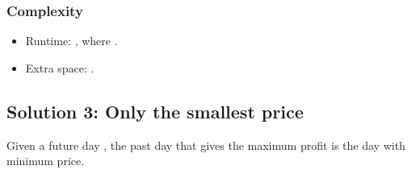 \documentclass[letterpaper,12pt,english]{book}
\begin{document}
\subsubsection{Complexity}
\label{\detokenize{Mathematics/09_MTH_121_Best_Time_to_Buy_and_Sell_Stock:id2}}\begin{itemize}
\item {} 
\sphinxAtStartPar
Runtime: , where .

\item {} 
\sphinxAtStartPar
Extra space: .

\end{itemize}


\subsection{Solution 3: Only the smallest price}
\label{\detokenize{Mathematics/09_MTH_121_Best_Time_to_Buy_and_Sell_Stock:solution-3-only-the-smallest-price}}
\sphinxAtStartPar
Given a future day , the past day  that gives the maximum profit is the day with minimum price.
\end{document}
